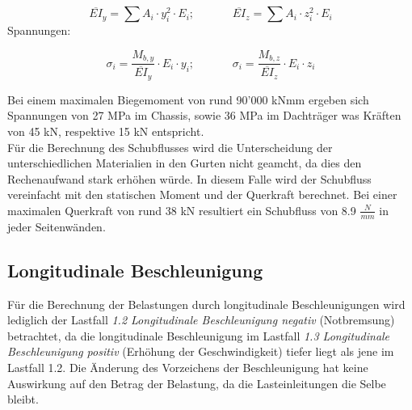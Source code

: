   \begin{equation}
    \label{eq:1}
      \overline{EI}_y = \sum A_i \cdot y_i^2 \cdot E_i; \;\;\;\;\;\;\;\;\;\;\;\;  \overline{EI}_z = \sum A_i \cdot z_i^2 \cdot E_i
  \end{equation}
  Spannungen:

  \begin{equation}
    \label{eq:2}
      \sigma_i = \frac{M_{b,y}}{\overline{EI}_y}\cdot E_i \cdot y_i; \;\;\;\;\;\;\;\;\;\;\;\; \sigma_i = \frac{M_{b,z}}{\overline{EI}_z}\cdot E_i \cdot z_i
  \end{equation}

  Bei einem maximalen Biegemoment von rund 90'000 kNmm ergeben sich Spannungen von 27 MPa im Chassis, sowie 36 MPa im Dachträger was Kräften von 45 kN, respektive 15 kN entspricht.\\

  Für die Berechnung des Schubflusses wird die Unterscheidung der unterschiedlichen Materialien in den Gurten nicht geamcht, da dies den Rechenaufwand stark erhöhen würde. In diesem Falle wird der Schubfluss vereinfacht mit den statischen Moment und der Querkraft berechnet. Bei einer maximalen Querkraft von rund 38 kN resultiert ein Schubfluss von 8.9 $\frac{N}{mm}$ in jeder Seitenwänden.\\


\subsection{Longitudinale Beschleunigung}
Für die Berechnung der Belastungen durch longitudinale Beschleunigungen wird lediglich der Lastfall \emph{1.2 Longitudinale Beschleunigung negativ} (Notbremsung) betrachtet, da die longitudinale Beschleunigung im Lastfall \emph{1.3 Longitudinale Beschleunigung positiv} (Erhöhung der Geschwindigkeit) tiefer liegt als jene im Lastfall 1.2. Die Änderung des Vorzeichens der Beschleunigung hat keine Auswirkung auf den Betrag der Belastung, da die Lasteinleitungen die Selbe bleibt.

